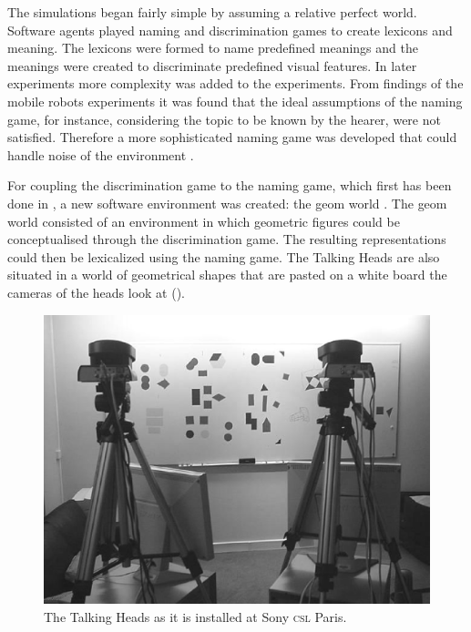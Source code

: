 The simulations began fairly simple by assuming a relative perfect world\linebreak \citep{steels:1996a,steels:1996b}. Software agents played naming and discrimination games to create lexicons and meaning. The lexicons were formed to name predefined meanings and the meanings were created to discriminate predefined visual features. In later experiments more complexity was added to the experiments. From findings of the mobile robots experiments \citep{vogt:1998a} it was found that the ideal assumptions of the naming game, for instance, considering the topic to be known by the hearer, were not satisfied. Therefore a more sophisticated naming game was developed that could handle noise of the environment \citep{steelskaplan:1998}. 

For coupling the discrimination game to the naming game, which first has been done in \citet{steelsvogt:1997}, a new software environment was created: the {\sc geom} world \citep{steels:2000}. The {\sc geom} world consisted of an environment in which geometric figures could be conceptualised through the discrimination game. The resulting representations could then be lexicalized using the naming game. The Talking Heads are also situated in a world of geometrical shapes that are pasted on a white board the cameras of the heads look at ().

\begin{figure}[t]
\centering
\includegraphics[width=\textwidth]{theory/th.eps}
\caption{The Talking Heads as it is installed at Sony {\scshape csl} Paris.}
\label{f:theory:talkingheads}
\end{figure}

